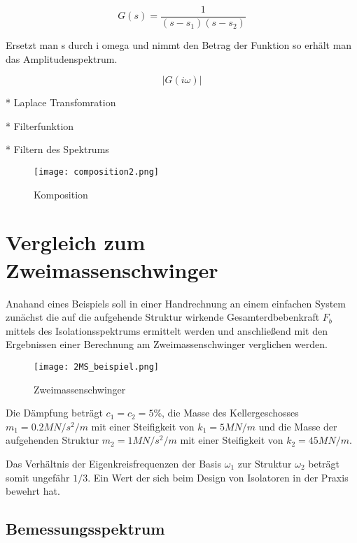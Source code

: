 \begin{equation} \label{laplace3}
G(s)=\frac{1}{(s-s_1)(s-s_2)}
\end{equation}

Ersetzt man s durch i omega und nimmt den Betrag der Funktion so erhält man das Amplitudenspektrum.

\begin{equation} \label{laplace-attan}
|G(i\omega)|
\end{equation}

* Laplace Transfomration

* Filterfunktion

* Filtern des Spektrums

\begin{figure}[ht]
    \centering
    \texttt{[image: composition2.png]}
    \caption{Komposition}
    \label{fig:composition}
\end{figure}


\pagebreak

\section{Vergleich zum Zweimassenschwinger}
\label{sec:vergleich}

Anahand eines Beispiels soll in einer Handrechnung an einem einfachen System zunächst die auf die aufgehende Struktur wirkende Gesamterdbebenkraft $F_b$ mittels des Isolationsspektrums ermittelt werden und anschließend mit den Ergebnissen einer Berechnung am Zweimassenschwinger verglichen werden.

\begin{figure}[ht]
    \centering
    \texttt{[image: 2MS\_beispiel.png]}
    \caption{Zweimassenschwinger}
    \label{fig:2ms}
\end{figure}

Die Dämpfung beträgt $c_1 = c_2 = 5\%$, die Masse des Kellergeschosses $m_1 = 0.2 MN/s^2/m$ mit einer Steifigkeit von $k_1 = 5 MN/m$ und die Masse der aufgehenden Struktur $m_2 = 1 MN/s^2/m$ mit einer Steifigkeit von $k_2 = 45 MN/m$.

Das Verhältnis der Eigenkreisfrequenzen der Basis $\omega_1$ zur Struktur $\omega_2$ beträgt somit ungefähr $1/3$. Ein Wert der sich beim Design von Isolatoren in der Praxis bewehrt hat.

\subsection{Bemessungsspektrum}

